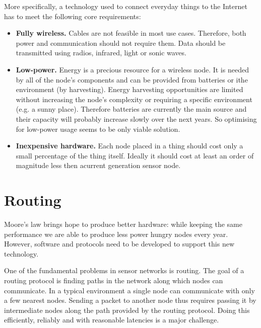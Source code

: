 More specifically, a technology used to connect everyday things to the Internet has to meet the following core requirements:
\begin{itemize}
  \item \textbf{Fully wireless.} Cables are not feasible in most use cases. Therefore, both power and communication should not require them.
Data should be transmitted using radios, infrared, light or sonic waves.
  \item \textbf{Low-power.} Energy is a precious resource for a wireless node.
It is needed by all of the node's components and can be provided from batteries or ithe environment (by harvesting).
Energy harvesting opportunities are limited without increasing the node's complexity or requiring a specific environment (e.g. a sunny place).
Therefore batteries are currently the main source and their capacity will probably increase slowly over the next years. So optimising for low-power usage seems to be only viable solution.
  \item \textbf{Inexpensive hardware.} Each node placed in a thing should cost only a small percentage of the thing itself.
Ideally it should cost at least an order of magnitude less then acurrent generation sensor node.
\end{itemize}

\section{Routing}
Moore's law brings hope to produce better hardware: while keeping the same performance we are able to produce less power hungry nodes every year.
However, software and protocols need to be developed to support this new technology.

One of the fundamental problems in sensor networks is routing.
The goal of a routing protocol is finding paths in the network along which nodes can communicate.
In a typical environment a single node can communicate with only a few nearest nodes.
Sending a packet to another node thus requires passing it by intermediate nodes along the path provided by the routing protocol.
Doing this efficiently, reliably and with reasonable latencies is a major challenge.

